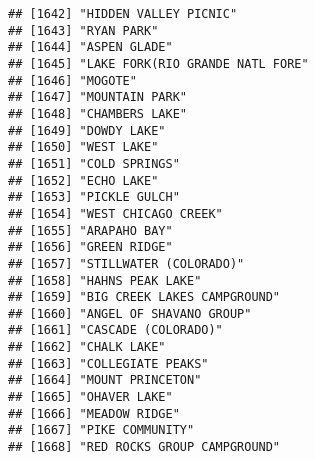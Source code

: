 \documentclass[
]{article}
\begin{document}
\begin{verbatim}
## [1642] "HIDDEN VALLEY PICNIC"                                                                
## [1643] "RYAN PARK"                                                                           
## [1644] "ASPEN GLADE"                                                                         
## [1645] "LAKE FORK(RIO GRANDE NATL FORE"                                                      
## [1646] "MOGOTE"                                                                              
## [1647] "MOUNTAIN PARK"                                                                       
## [1648] "CHAMBERS LAKE"                                                                       
## [1649] "DOWDY LAKE"                                                                          
## [1650] "WEST LAKE"                                                                           
## [1651] "COLD SPRINGS"                                                                        
## [1652] "ECHO LAKE"                                                                           
## [1653] "PICKLE GULCH"                                                                        
## [1654] "WEST CHICAGO CREEK"                                                                  
## [1655] "ARAPAHO BAY"                                                                         
## [1656] "GREEN RIDGE"                                                                         
## [1657] "STILLWATER (COLORADO)"                                                               
## [1658] "HAHNS PEAK LAKE"                                                                     
## [1659] "BIG CREEK LAKES CAMPGROUND"                                                          
## [1660] "ANGEL OF SHAVANO GROUP"                                                              
## [1661] "CASCADE (COLORADO)"                                                                  
## [1662] "CHALK LAKE"                                                                          
## [1663] "COLLEGIATE PEAKS"                                                                    
## [1664] "MOUNT PRINCETON"                                                                     
## [1665] "OHAVER LAKE"                                                                         
## [1666] "MEADOW RIDGE"                                                                        
## [1667] "PIKE COMMUNITY"                                                                      
## [1668] "RED ROCKS GROUP CAMPGROUND"                                                          

\end{verbatim}
\end{document}
